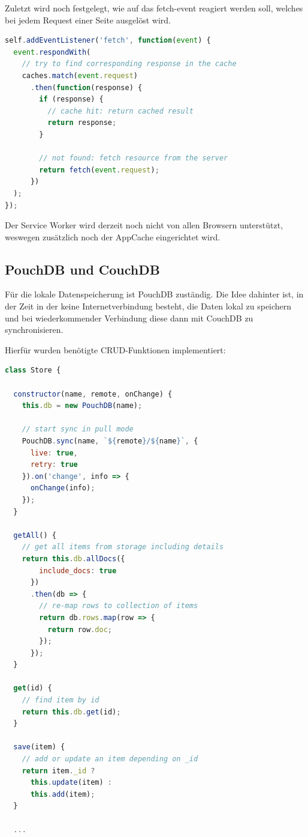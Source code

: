 Zuletzt wird noch festgelegt, wie auf das fetch-event\cite{fetch} reagiert werden soll, welches bei jedem Request einer Seite ausgelöst wird. 

\begin{lstlisting}[language=JavaScript]
self.addEventListener('fetch', function(event) {
  event.respondWith(
    // try to find corresponding response in the cache
    caches.match(event.request)
      .then(function(response) {
        if (response) {
          // cache hit: return cached result
          return response;
        }

        // not found: fetch resource from the server
        return fetch(event.request);
      })
  );
});
\end{lstlisting}

Der Service Worker wird derzeit noch nicht von allen Browsern unterstützt\cite{sworkerusage}, weswegen zusätzlich noch der AppCache\cite{appcache} eingerichtet wird. 

\subsection{PouchDB und CouchDB}

Für die lokale Datenspeicherung ist PouchDB zuständig. Die Idee dahinter ist, in der Zeit in der keine Internetverbindung besteht, die Daten lokal zu speichern und bei wiederkommender Verbindung diese dann mit CouchDB zu synchronisieren. 

Hierfür wurden benötigte CRUD-Funktionen implementiert:
\begin{lstlisting}[language=JavaScript]
class Store {

  constructor(name, remote, onChange) {
    this.db = new PouchDB(name);

    // start sync in pull mode
    PouchDB.sync(name, `${remote}/${name}`, {
      live: true,
      retry: true
    }).on('change', info => {
      onChange(info);
    });
  }

  getAll() {
    // get all items from storage including details
    return this.db.allDocs({
        include_docs: true
      })
      .then(db => {
        // re-map rows to collection of items
        return db.rows.map(row => {
          return row.doc;
        });
      });
  }

  get(id) {
    // find item by id
    return this.db.get(id);
  }

  save(item) {
    // add or update an item depending on _id
    return item._id ?
      this.update(item) :
      this.add(item);
  }

  ...
\end{lstlisting}

